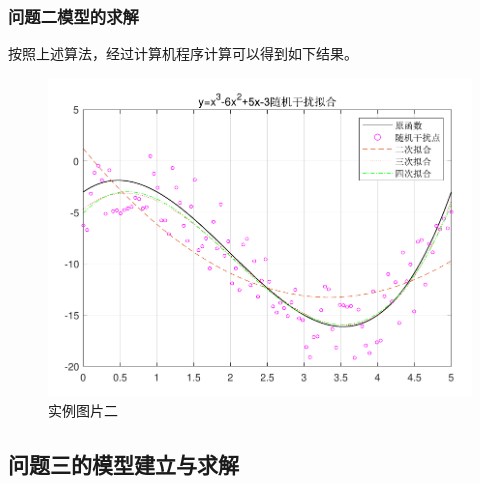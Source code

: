 \documentclass{my_cumcmthesis}
\begin{document}
\subsubsection{问题二模型的求解}
    按照上述算法，经过计算机程序计算可以得到如下结果。
    \begin{figure}[htbp]
        \centering
        \includegraphics[scale=0.8]{source/FunctionFitting.pdf}
        \caption{实例图片二}
        \label{fig:eg2}
    \end{figure}

\subsection{问题三的模型建立与求解}
\end{document}
